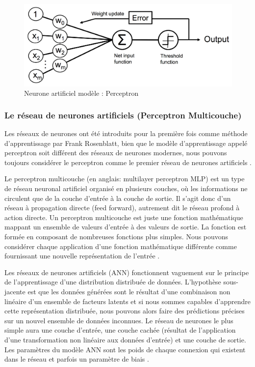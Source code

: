 	\begin{figure}[hth]%
		\centering
		\includegraphics[width=\textwidth]{images/perceptron_neuron.png}
		\caption{Neurone artificiel modèle : Perceptron \cite{ml2008python}
		}
		\label{fig:perceptron_neuron}
	\end{figure}

	\subsubsection{Le réseau de neurones artificiels (Perceptron Multicouche)}
	
	Les réseaux de neurones ont été introduits pour la première fois comme méthode d'apprentissage par Frank Rosenblatt, bien que le modèle d'apprentissage appelé perceptron soit différent des réseaux de neurones modernes, nous pouvons toujours considérer le perceptron comme le premier réseau de neurones artificiels \cite{sarkar2017practical}.

	Le perceptron multicouche (en anglais: multilayer perceptron MLP) est un type de réseau neuronal artificiel organisé en plusieurs couches, où les informations ne circulent que de la couche d'entrée à la couche de sortie. Il s'agit donc d'un réseau à propagation directe (feed forward), autrement dit le réseau profond à action directe. Un perceptron multicouche est juste une fonction mathématique mappant un ensemble de valeurs d'entrée à des valeurs de sortie. La fonction est formée en composant de nombreuses fonctions plus simples. Nous pouvons considérer chaque application d'une fonction mathématique différente comme fournissant une nouvelle représentation de l'entrée \cite{goodfellow2016deep,antoine2018apprentissage}.
	
	Les réseaux de neurones artificiels (ANN) fonctionnent vaguement sur le principe de l'apprentissage d'une distribution distribuée de données.
	L'hypothèse sous-jacente est que les données générées sont le résultat d'une combinaison non linéaire d'un ensemble de facteurs latents et si nous sommes capables d'apprendre cette représentation distribuée, nous pouvons alors faire des prédictions précises sur un nouvel ensemble de données inconnues. Le réseau de neurones le plus simple aura une couche d'entrée, une couche cachée (résultat de l'application d'une transformation non linéaire aux données d'entrée) et une couche de sortie. Les paramètres du modèle ANN sont les poids de chaque connexion qui existent dans le réseau et parfois un paramètre de biais \cite{sarkar2017practical}.
	

